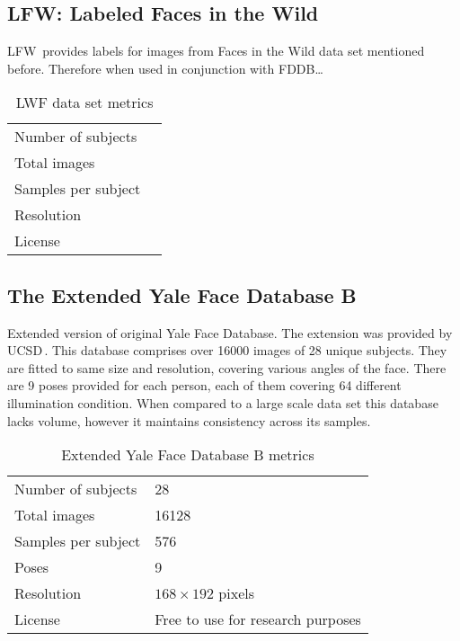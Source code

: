 \subsection{LFW: Labeled Faces in the Wild}

LFW\,\cite{lfw} provides labels for images from Faces in the Wild data set mentioned before. Therefore when used in conjunction with FDDB\dots{}

\begin{table}[ht]
    \centering
    \caption{LWF data set metrics}

    \begin{tabularx}{0.75\textwidth}{l|l}
        \toprule
        Number of subjects &  \\
        Total images &  \\
        Samples per subject &  \\
        Resolution &  \\
        License &  \\
        \bottomrule
    \end{tabularx}
\end{table}

\subsection{The Extended Yale Face Database B}

Extended version of original Yale Face Database. The extension was provided by UCSD\,\cite{ext_yale_paper}. This database comprises over \num{16000} images of 28 unique subjects. They are fitted to same size and resolution, covering various angles of the face. There are 9 poses provided for each person, each of them covering 64 different illumination condition.  When compared to a large scale data set this database lacks volume, however it maintains consistency across its samples.

\begin{table}[ht]
    \centering
    \caption{Extended Yale Face Database B metrics}

    \begin{tabularx}{0.75\textwidth}{l|l}
        \toprule
        Number of subjects & 28 \\
        Total images & \num{16128} \\
        Samples per subject & 576 \\
        Poses & 9 \\
        Resolution & $168 \times 192$ pixels \\
        License & Free to use for research purposes\\
        \bottomrule
    \end{tabularx}
\end{table}


